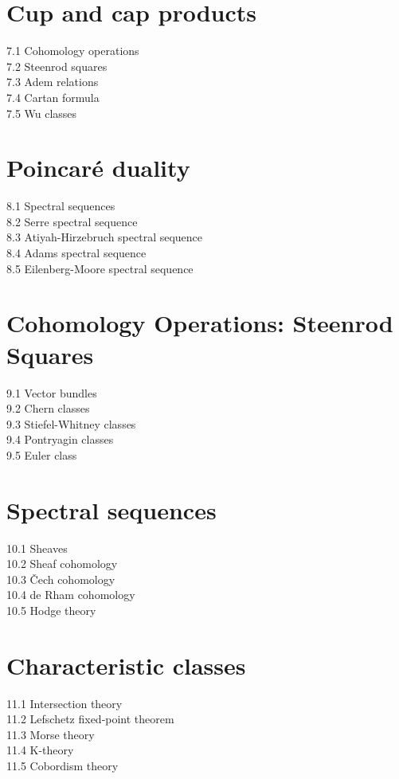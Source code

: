 \section{Cup and cap products}
7.1 Cohomology operations\\
7.2 Steenrod squares\\
7.3 Adem relations\\
7.4 Cartan formula\\
7.5 Wu classes
\section{Poincaré duality}
8.1 Spectral sequences\\
8.2 Serre spectral sequence\\
8.3 Atiyah-Hirzebruch spectral sequence\\
8.4 Adams spectral sequence\\
8.5 Eilenberg-Moore spectral sequence
\section{Cohomology Operations: Steenrod Squares}
9.1 Vector bundles\\
9.2 Chern classes\\
9.3 Stiefel-Whitney classes\\
9.4 Pontryagin classes\\
9.5 Euler class
\section{Spectral sequences}
10.1 Sheaves\\
10.2 Sheaf cohomology\\
10.3 Čech cohomology\\
10.4 de Rham cohomology\\
10.5 Hodge theory
\section{Characteristic classes}
11.1 Intersection theory\\
11.2 Lefschetz fixed-point theorem\\
11.3 Morse theory\\
11.4 K-theory\\
11.5 Cobordism theory
